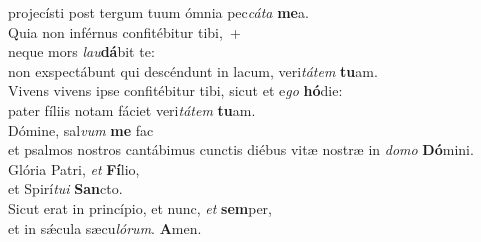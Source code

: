 \evenverse projecísti post tergum tuum ómnia pec\textit{cá}\textit{ta} \textbf{me}a.\\
\oddverse Quia non inférnus confitébitur tibi,~+\\
\oddverse  neque mors \textit{lau}\textbf{dá}bit te:~\*\\
\oddverse non exspectábunt qui descéndunt in lacum, veri\textit{tá}\textit{tem} \textbf{tu}am.\\
\evenverse Vivens vivens ipse confitébitur tibi, sicut et e\textit{go} \textbf{hó}die:~\*\\
\evenverse pater fíliis notam fáciet veri\textit{tá}\textit{tem} \textbf{tu}am.\\
\oddverse Dómine, sal\textit{vum} \textbf{me} fac~\*\\
\oddverse et psalmos nostros cantábimus cunctis diébus vitæ nostræ in \textit{do}\textit{mo} \textbf{Dó}mini.\\
\evenverse Glória Patri, \textit{et} \textbf{Fí}lio,~\*\\
\evenverse et Spirí\textit{tu}\textit{i} \textbf{San}cto.\\
\oddverse Sicut erat in princípio, et nunc, \textit{et} \textbf{sem}per,~\*\\
\oddverse et in sǽcula sæcu\textit{ló}\textit{rum}. \textbf{A}men.\\
